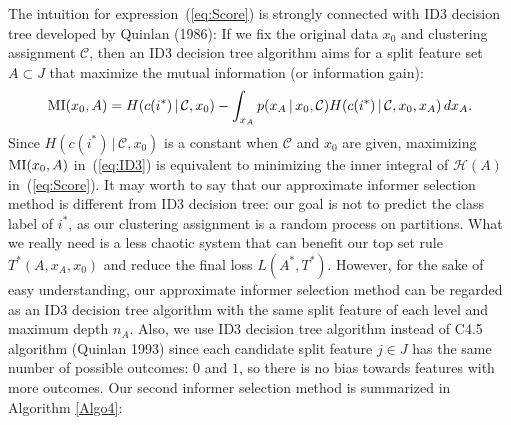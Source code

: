 \documentclass[12pt]{article}
\begin{document}
The intuition for expression~(\ref{eq:Score}) is strongly connected with ID3 decision tree developed by Quinlan (1986): If we fix the original data $x_0$ and clustering assignment $\mathcal{C}$, then an ID3 decision tree algorithm aims for a split feature set $A\subset J$ that maximize the mutual information (or information gain):
\begin{eqnarray}
\label{eq:ID3}
{\rm MI}(x_0, A) = H(c(i^*)\,|\, \mathcal{C},x_0) - \int_{x_A} p(x_A\,|\,x_0,\mathcal{C})H(c(i^*)\,|\, \mathcal{C},x_0, x_A)\,dx_A.
\end{eqnarray}
Since $H(c(i^*)\,|\,\mathcal{C},x_0)$ is a constant when $\mathcal{C}$ and $x_0$ are given, maximizing ${\rm MI}(x_0, A)$ in~(\ref{eq:ID3}) is equivalent to minimizing the inner integral of $\mathcal H(A)$ in~(\ref{eq:Score}). It may worth to say that our approximate informer selection method is different from ID3 decision tree: our goal is not to predict the class label of $i^*$, as our clustering assignment is a random process on partitions. What we really need is a less chaotic system that can benefit our top set rule $T^*(A,x_A,x_0)$ and reduce the final loss $L(A^*,T^*)$. However, for the sake of easy understanding, our approximate informer selection method can be regarded as an ID3 decision tree algorithm with the same split feature of each level and maximum depth $n_A$. Also, we use ID3 decision tree algorithm instead of C4.5 algorithm (Quinlan 1993) since each candidate split feature $j\in J$ has the same number of possible outcomes: $0$ and $1$, so there is no bias towards features with more outcomes. Our second informer selection method is summarized in Algorithm \ref{Algo4}:
\end{document}
